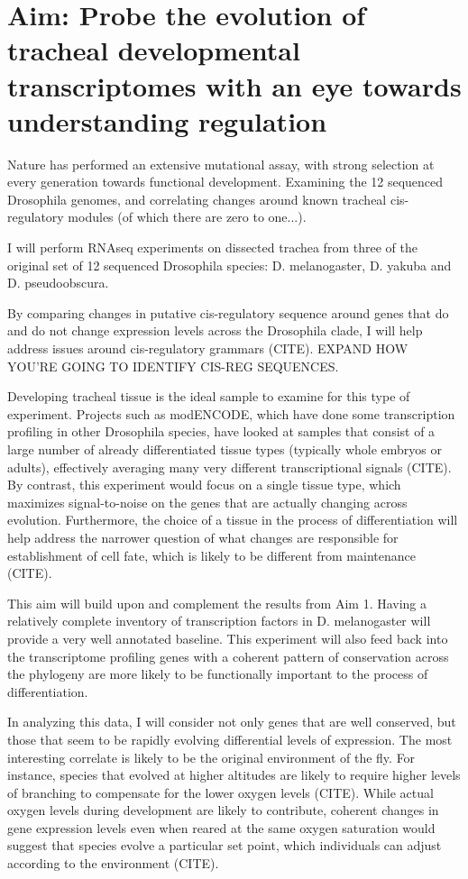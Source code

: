 \documentclass{proposal}
\begin{document}
\section{Aim: Probe the evolution of tracheal developmental transcriptomes with an eye towards understanding regulation}
Nature has performed an extensive mutational assay, with strong selection at every generation towards functional development.  Examining the 12 sequenced Drosophila genomes, and correlating changes around known tracheal cis-regulatory modules (of which there are zero to one...).

I will perform RNAseq experiments on dissected trachea from three of the original set of 12 sequenced Drosophila species: D. melanogaster, D. yakuba and D. pseudoobscura.

By comparing changes in putative cis-regulatory sequence around genes that do and do not change expression levels across the Drosophila clade, I will help address issues around cis-regulatory grammars (CITE). EXPAND HOW YOU'RE GOING TO IDENTIFY CIS-REG SEQUENCES.

Developing tracheal tissue is the ideal sample to examine for this type of experiment.  Projects such as modENCODE, which have done some transcription profiling in other Drosophila species, have looked at samples that consist of a large number of already differentiated tissue types (typically whole embryos or adults), effectively averaging many very different transcriptional signals (CITE).  By contrast, this experiment would focus on a single tissue type, which maximizes signal-to-noise on the genes that are actually changing across evolution.  Furthermore, the choice of a tissue in the process of differentiation will help address the narrower question of what changes are responsible for establishment of cell fate, which is likely to be different from maintenance (CITE). 

This aim will build upon and complement the results from Aim 1.  Having a relatively complete inventory of transcription factors in D. melanogaster will provide a very well annotated baseline.   This experiment will also feed back into the transcriptome profiling genes with a coherent pattern of conservation across the phylogeny are more likely to be functionally important to the process of differentiation.

 In analyzing this data, I will consider not only genes that are well conserved, but those that seem to be rapidly evolving differential levels of expression.  The most interesting correlate is likely to be the original environment of the fly.  For instance, species that evolved at higher altitudes are likely to require higher levels of branching to compensate for the lower oxygen levels (CITE).  While actual oxygen levels during development are likely to contribute, coherent changes in gene expression levels even when reared at the same oxygen saturation would suggest that species evolve a particular set point, which individuals can adjust according to the environment (CITE). 
\end{document}
